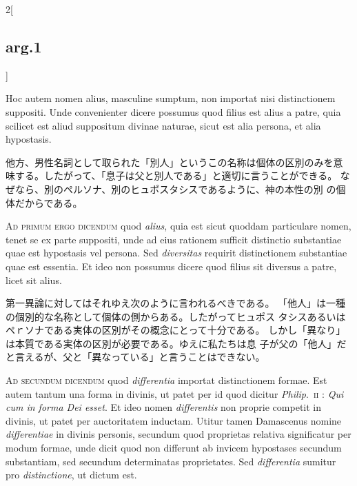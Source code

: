 \documentclass[paper=a4paper,fontsize=10pt,jafontsize=9pt,titlepage]{jlreq}
\begin{document}
\begin{paracol}{2}[\subsection{arg.1}]
\switchcolumn*

Hoc autem nomen alius, masculine sumptum, non importat
nisi distinctionem suppositi. Unde convenienter dicere possumus quod
filius est alius a patre, quia scilicet est aliud suppositum divinae
naturae, sicut est alia persona, et alia hypostasis.

\switchcolumn

他方、男性名詞として取られた「別人」というこの名称は個体の区別のみを意
 味する。したがって、「息子は父と別人である」と適切に言うことができる。
 なぜなら、別のペルソナ、別のヒュポスタシスであるように、神の本性の別
 の個体だからである。

\switchcolumn*[\subsection{ad.1}]

{\scshape Ad primum ergo dicendum} quod {\itshape alius}, quia est sicut quoddam particulare
nomen, tenet se ex parte suppositi, unde ad eius rationem sufficit
distinctio substantiae quae est hypostasis vel persona. Sed {\itshape diversitas}
requirit distinctionem substantiae quae est essentia. Et ideo non
possumus dicere quod filius sit diversus a patre, licet sit alius.

\switchcolumn

第一異論に対してはそれゆえ次のように言われるべきである。
「他人」は一種の個別的な名称として個体の側からある。したがってヒュポス
 タシスあるいはペｒソナである実体の区別がその概念にとって十分である。
 しかし「異なり」は本質である実体の区別が必要である。ゆえに私たちは息
 子が父の「他人」だと言えるが、父と「異なっている」と言うことはできない。

\switchcolumn*[\subsection{ad.2}]

{\scshape Ad secundum dicendum} quod {\itshape differentia} importat distinctionem
formae. Est autem tantum una forma in divinis, ut patet per id quod
dicitur {\itshape Philip}.~{\scshape ii} : {\itshape Qui cum in forma Dei esset}. Et ideo nomen
{\itshape differentis} non proprie competit in divinis, ut patet per auctoritatem
inductam. Utitur tamen Damascenus nomine {\itshape differentiae} in divinis
personis, secundum quod proprietas relativa significatur per modum
formae, unde dicit quod non differunt ab invicem hypostases secundum
substantiam, sed secundum determinatas proprietates. Sed {\itshape differentia}
sumitur pro {\itshape distinctione}, ut dictum est.


\end{paracol}
\end{document}
